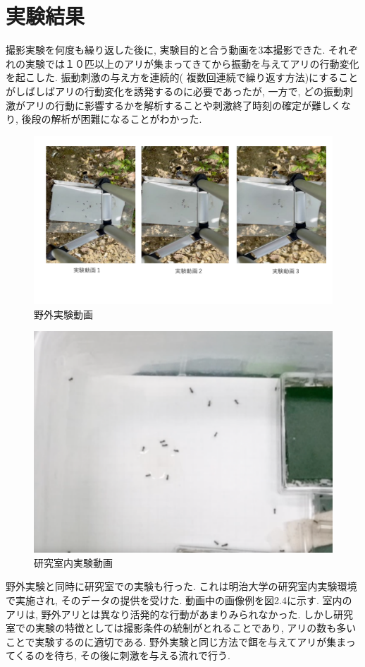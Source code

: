 ﻿\documentclass[a4paper, 12pt]{jsreport}
\begin{document}
\section{実験結果}
\label{sec:expresult}
撮影実験を何度も繰り返した後に, 実験目的と合う動画を3本撮影できた. それぞれの実験では１０匹以上のアリが集まってきてから振動を与えてアリの行動変化を起こした. 振動刺激の与え方を連続的( 複数回連続で繰り返す方法)にすることがしばしばアリの行動変化を誘発するのに必要であったが, 一方で, どの振動刺激がアリの行動に影響するかを解析することや刺激終了時刻の確定が難しくなり, 後段の解析が困難になることがわかった. 
\begin{figure}[tbp]
\centering
\includegraphics[width=13cm,  keepaspectratio]{exp_video.pdf}
\caption[Short figure caption for List of Figures]{野外実験動画}
\label{fig:paper1_fig4}
\end{figure}
\begin{figure}[tbp]
\centering
\includegraphics[width=13cm,  keepaspectratio]{exp_video_1.pdf}
\caption[Short figure caption for List of Figures]{研究室内実験動画}
\label{fig:paper1_fig5}
\end{figure}
野外実験と同時に研究室での実験も行った. これは明治大学の研究室内実験環境で実施され, そのデータの提供を受けた. 動画中の画像例を図2.4に示す. 室内のアリは, 野外アリとは異なり活発的な行動があまりみられなかった. しかし研究室での実験の特徴としては撮影条件の統制がとれることであり, アリの数も多いことで実験するのに適切である. 野外実験と同じ方法で餌を与えてアリが集まってくるのを待ち, その後に刺激を与える流れで行う. 
\end{document}
